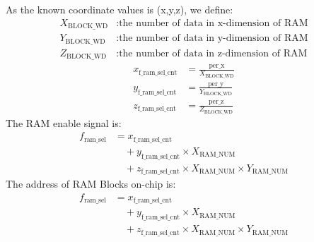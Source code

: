 \documentclass[conference]{IEEEtran}
\begin{document}
\noindent As the known coordinate values is (x,y,z), we define:
\begin{align*}
    X_{\text{BLOCK\_WD}} &: \text{the number of data in x-dimension of RAM} \\
    Y_{\text{BLOCK\_WD}} &: \text{the number of data in y-dimension of RAM} \\
    Z_{\text{BLOCK\_WD}} &: \text{the number of data in z-dimension of RAM}
    \end{align*}
\begin{align*}
    x_{\text{f\_ram\_sel\_cnt}} &= \frac{\text{per\_x}}{X_{\text{BLOCK\_WD}}} \\
    y_{\text{f\_ram\_sel\_cnt}} &= \frac{\text{per\_y}}{Y_{\text{BLOCK\_WD}}} \\
    z_{\text{f\_ram\_sel\_cnt}} &= \frac{\text{per\_z}}{Z_{\text{BLOCK\_WD}}}
    \end{align*}
The RAM enable signal is:
\begin{align*}
    f_{\text{ram\_sel}} &= x_{\text{f\_ram\_sel\_cnt}} \\
    &\quad + y_{\text{f\_ram\_sel\_cnt}} \times X_{\text{RAM\_NUM}} \\
    &\quad + z_{\text{f\_ram\_sel\_cnt}} \times X_{\text{RAM\_NUM}} \times Y_{\text{RAM\_NUM}}
    \end{align*}
The address of RAM Blocks on-chip is:
\begin{align*}
     f_{\text{ram\_sel}} &= x_{\text{f\_ram\_sel\_cnt}} \\
     &\quad + y_{\text{f\_ram\_sel\_cnt}} \times X_{\text{RAM\_NUM}} \\
     &\quad + z_{\text{f\_ram\_sel\_cnt}} \times X_{\text{RAM\_NUM}} \times Y_{\text{RAM\_NUM}}
    \end{align*}
\end{document}
